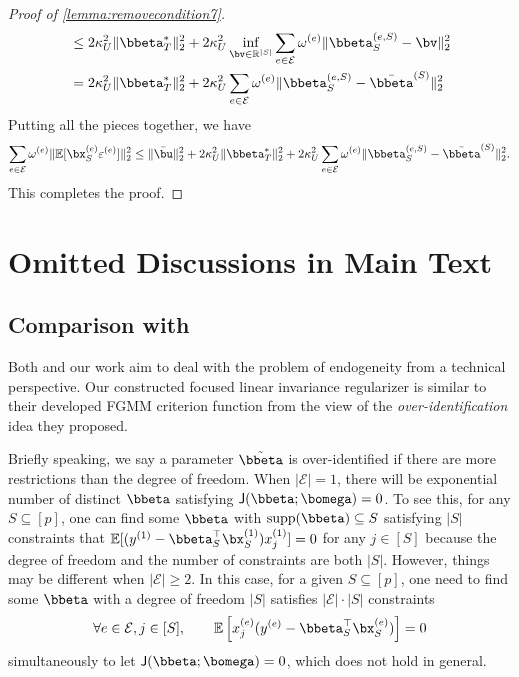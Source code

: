 \documentclass[10pt]{article}
\numberwithin{equation}{section}
\newcommand*{\supp}{\mathrm{supp}}
\begin{document}
\begin{proof}[Proof of \cref{lemma:removecondition7}]
\begin{align*}
    &\le 2\kappa_U^2 \| \bbeta_T^* \|_2^2 + 2\kappa_U^2 \inf_{\bv \in \mathbb{R}^{|S|}} \sum_{e\in \mathcal{E}} \omega^{(e)} \| \bbeta_S^{(e,S)} - \bv\|_2^2 \\
    &= 2\kappa_U^2 \|\bbeta_T^*\|_2^2 + 2\kappa_U^2 \sum_{e\in \mathcal{E}} \omega^{(e)} \| \bbeta_S^{(e,S)} - \bar{\bbeta}^{(S)}\|_2^2
\end{align*} Putting all the pieces together, we have
\begin{align*}
\sum_{e\in \mathcal{E}} \omega^{(e)} \|\mathbb{E}[\bx_S^{(e)} \varepsilon^{(e)}] \|_2^2 \le \|\bar{\bu}\|_2^2 + 2\kappa_U^2 \|\bbeta_T^*\|_2^2 + 2\kappa_U^2 \sum_{e\in \mathcal{E}} \omega^{(e)} \| \bbeta_S^{(e,S)} - \bar{\bbeta}^{(S)}\|_2^2.
\end{align*} This completes the proof.

\end{proof}
\fi

\section{Omitted Discussions in Main Text}
\label{sec:discussion}

\subsection{Comparison with \cite{fan2014endogeneity}}
\label{subsec:discussionliao}

Both \cite{fan2014endogeneity} and our work aim to deal with the problem of endogeneity from a technical perspective. Our constructed focused linear invariance regularizer is similar to their developed FGMM criterion function from the view of the \emph{over-identification} idea they proposed. 

Briefly speaking, we say a parameter $\tilde{\bbeta}$ is over-identified if there are more restrictions than the degree of freedom. When $|\mathcal{E}|=1$, there will be exponential number of distinct $\bbeta$ satisfying $\mathsf{J}(\bbeta;\bomega)=0$. To see this, for any $S \subseteq [p]$, one can find some $\bbeta$ with $\supp(\bbeta) \subseteq S$ satisfying $|S|$ constraints that $\mathbb{E}[(y^{(1)} - \bbeta_S^\top \bx_S^{(1)}) x_j^{(1)}] = 0$ for any $j \in [S]$ because the degree of freedom and the number of constraints are both $|S|$. However, things may be different when $|\mathcal{E}| \ge 2$. In this case, for a given $S \subseteq [p]$, one need to find some $\bbeta$ with a degree of freedom $|S|$ satisfies $|\mathcal{E}| \cdot |S|$ constraints 
\begin{align*}
    \forall e \in \mathcal{E}, j\in [S], ~~~~~~ \mathbb{E}\left[x^{(e)}_j (y^{(e)} - \bbeta_S^\top \bx_S^{(e)})\right] = 0
\end{align*}
simultaneously to let $\mathsf{J}(\bbeta;\bomega)=0$, which does not hold in general.
\end{document}
